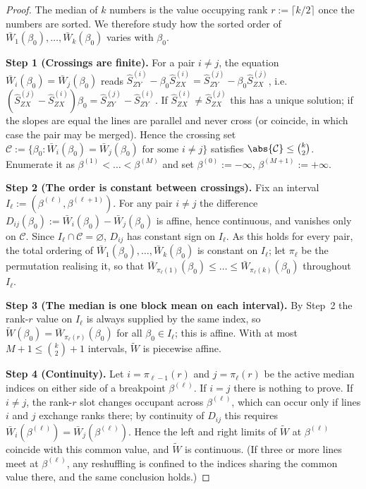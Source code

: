 \begin{proof}
The median of $k$ numbers is the value occupying rank $r:=\lceil k/2\rceil$ once the numbers are sorted. We therefore study how the sorted order of $\bar{W}_1(\beta_0),\dots,\bar{W}_k(\beta_0)$ varies with $\beta_0$.
 
\medskip\noindent\textbf{Step 1 (Crossings are finite).} For a pair $i\neq j$, the equation $\bar{W}_i(\beta_0)=\bar{W}_j(\beta_0)$ reads $\hat{S}_{ZY}^{(i)}-\beta_0\hat{S}_{ZX}^{(i)} =\hat{S}_{ZY}^{(j)}-\beta_0\hat{S}_{ZX}^{(j)}$, i.e.\ $(\hat{S}_{ZX}^{(j)}-\hat{S}_{ZX}^{(i)})\beta_0 =\hat{S}_{ZY}^{(j)}-\hat{S}_{ZY}^{(i)}$. If $\hat{S}_{ZX}^{(i)}\neq\hat{S}_{ZX}^{(j)}$ this has a unique solution; if the slopes are equal the lines are parallel and never cross (or coincide, in which case the pair may be merged). Hence the crossing set $\mathcal{C}:=\{\beta_0 : \bar{W}_i(\beta_0)=\bar{W}_j(\beta_0)\text{ for some } i\neq j\}$ satisfies $\abs{\mathcal{C}}\le\binom{k}{2}$. Enumerate it as $\beta^{(1)}<\dots<\beta^{(M)}$ and set $\beta^{(0)}:=-\infty$, $\beta^{(M+1)}:=+\infty$.
 
\medskip\noindent\textbf{Step 2 (The order is constant between crossings).} Fix an interval $I_\ell:=(\beta^{(\ell)},\beta^{(\ell+1)})$. For any pair $i\neq j$ the difference $D_{ij}(\beta_0):=\bar{W}_i(\beta_0)-\bar{W}_j(\beta_0)$ is affine, hence continuous, and vanishes only on $\mathcal{C}$. Since $I_\ell\cap\mathcal{C}=\varnothing$, $D_{ij}$ has constant sign on $I_\ell$. As this holds for every pair, the total ordering of $\bar{W}_1(\beta_0),\dots,\bar{W}_k(\beta_0)$ is constant on $I_\ell$; let $\pi_\ell$ be the permutation realising it, so that $\bar{W}_{\pi_\ell(1)}(\beta_0)\le\dots\le\bar{W}_{\pi_\ell(k)}(\beta_0)$ throughout $I_\ell$.
 
\medskip\noindent\textbf{Step 3 (The median is one block mean on each interval).} By Step~2 the rank-$r$ value on $I_\ell$ is always supplied by the same index, so $\widetilde{W}(\beta_0)=\bar{W}_{\pi_\ell(r)}(\beta_0)$ for all $\beta_0\in I_\ell$; this is affine. With at most $M+1\le\binom{k}{2}+1$ intervals, $\widetilde{W}$ is piecewise affine.
 
\medskip\noindent\textbf{Step 4 (Continuity).} Let $i=\pi_{\ell-1}(r)$ and $j=\pi_\ell(r)$ be the active median indices on either side of a breakpoint $\beta^{(\ell)}$. If $i=j$ there is nothing to prove. If $i\neq j$, the rank-$r$ slot changes occupant across $\beta^{(\ell)}$, which can occur only if lines $i$ and $j$ exchange ranks there; by continuity of $D_{ij}$ this requires $\bar{W}_i(\beta^{(\ell)})=\bar{W}_j(\beta^{(\ell)})$. Hence the left and right limits of $\widetilde{W}$ at $\beta^{(\ell)}$ coincide with this common value, and $\widetilde{W}$ is continuous. (If three or more lines meet at $\beta^{(\ell)}$, any reshuffling is confined to the indices sharing the common value there, and the same conclusion holds.)
\end{proof}

